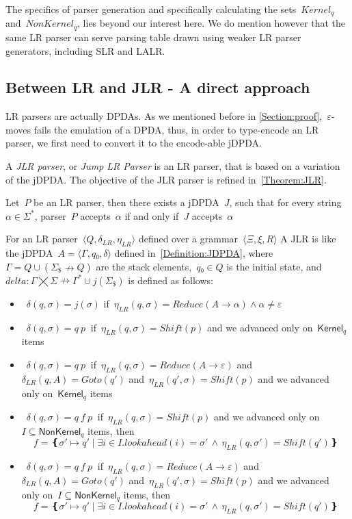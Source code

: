 The specifics of parser generation and specifically
  calculating the sets~$Kernel_{q}$ and~$NonKernel_{q}$, lies beyond our interest here.
We do mention however that the same LR parser can serve parsing table drawn using weaker LR parser generators,
including SLR and LALR\@.

\subsection{Between LR and JLR - A direct approach}
LR parsers are actually DPDAs\@. As we mentioned before in \cref{Section:proof},~$ε$-moves
  fails the emulation of a DPDA, thus, in order to type-encode an LR parser, we first need
  to convert it to the encode-able jDPDA\@.

A \emph{JLR parser}, or \emph{Jump LR Parser} is an LR parser, that
  is based on a variation of the jDPDA\@.
The objective of the JLR parser is refined in~\cref{Theorem:JLR}.

\begin{Theorem}
  \label{Theorem:JLR}
  Let~$P$ be an LR parser, then there exists a jDPDA~$J$,
  such that for every string~$α∈Σ^*$, parser~$P$ accepts~$α$
    if and only if~$J$ accepts~$α$
\end{Theorem}

For an LR parser~$⟨Q,δ_{LR}, η_{LR}⟩$ defined over a grammar~$⟨Ξ,ξ,R⟩$
A JLR is like the jDPDA~$A=⟨Γ,q₀,δ⟩$ defined in~\cref{Definition:JDPDA},
  where~$Γ= Q∪(Σ_\$↛Q)$ are the stack elements,~$q₀∈Q$
  is the initial state, and~$delta:Γ⨉Σ↛Γ^*∪j(Σ_\$)$ is defined as follows:
  \begin{itemize}
   \item~$δ(q,σ)= j(σ)$ if~$η_{LR}(q,σ)=Reduce(A→α)∧α≠ε$


   \item~$δ(q,σ)= q \: p~$ if~$η_{LR}(q,σ)=Shift(p)$ and we advanced only on~$\textsf{Kernel}_q$ items
   \item~$δ(q,σ)= q \: p~$ if~$η_{LR}(q,σ)=Reduce(A→ε)$
     and~$δ_{LR}(q,A)=Goto(q')$ and~$η_{LR}(q',σ)=Shift(p)$
     and we advanced only on~$\textsf{Kernel}_q$ items


   \item~$δ(q,σ)= q \: f \: p~$ if~$η_{LR}(q,σ)=Shift(p)$ and we advanced only on~$I⊆\textsf{NonKernel}_q$
     items, then
    \[
      f = ❴σ'↦q' \; | \;∃i∈I. lookahead(i)=σ' \,∧\, η_{LR}(q,σ')=Shift(q')❵
    \]

   \item~$δ(q,σ)= q \: f \: p~$ if~$η_{LR}(q,σ)=Reduce(A→ε)$
     and~$δ_{LR}(q,A)=Goto(q')$ and~$η_{LR}(q',σ)=Shift(p)$
     and we advanced only on~$I⊆\textsf{NonKernel}_q$
     items, then
     \[
      f = ❴σ'↦q' \; | \;∃i∈I. lookahead(i)=σ' \,∧\, η_{LR}(q,σ')=Shift(q')❵
     \]

  \end{itemize}
